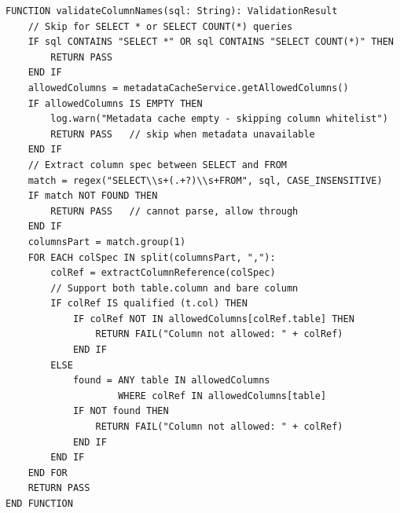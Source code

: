 \begin{table}[H]
\small\singlespacing
\centering
\caption{Pseudocode --- validateColumnNames() Column Whitelist Verification (Layer 4)}
\label{tab:pseudocode-validate-cols}
\vspace{2mm}

\begin{lstlisting}
FUNCTION validateColumnNames(sql: String): ValidationResult
    // Skip for SELECT * or SELECT COUNT(*) queries
    IF sql CONTAINS "SELECT *" OR sql CONTAINS "SELECT COUNT(*)" THEN
        RETURN PASS
    END IF
    allowedColumns = metadataCacheService.getAllowedColumns()
    IF allowedColumns IS EMPTY THEN
        log.warn("Metadata cache empty - skipping column whitelist")
        RETURN PASS   // skip when metadata unavailable
    END IF
    // Extract column spec between SELECT and FROM
    match = regex("SELECT\\s+(.+?)\\s+FROM", sql, CASE_INSENSITIVE)
    IF match NOT FOUND THEN
        RETURN PASS   // cannot parse, allow through
    END IF
    columnsPart = match.group(1)
    FOR EACH colSpec IN split(columnsPart, ","):
        colRef = extractColumnReference(colSpec)
        // Support both table.column and bare column
        IF colRef IS qualified (t.col) THEN
            IF colRef NOT IN allowedColumns[colRef.table] THEN
                RETURN FAIL("Column not allowed: " + colRef)
            END IF
        ELSE
            found = ANY table IN allowedColumns
                    WHERE colRef IN allowedColumns[table]
            IF NOT found THEN
                RETURN FAIL("Column not allowed: " + colRef)
            END IF
        END IF
    END FOR
    RETURN PASS
END FUNCTION
\end{lstlisting}
\end{table}


\vspace{3mm}

